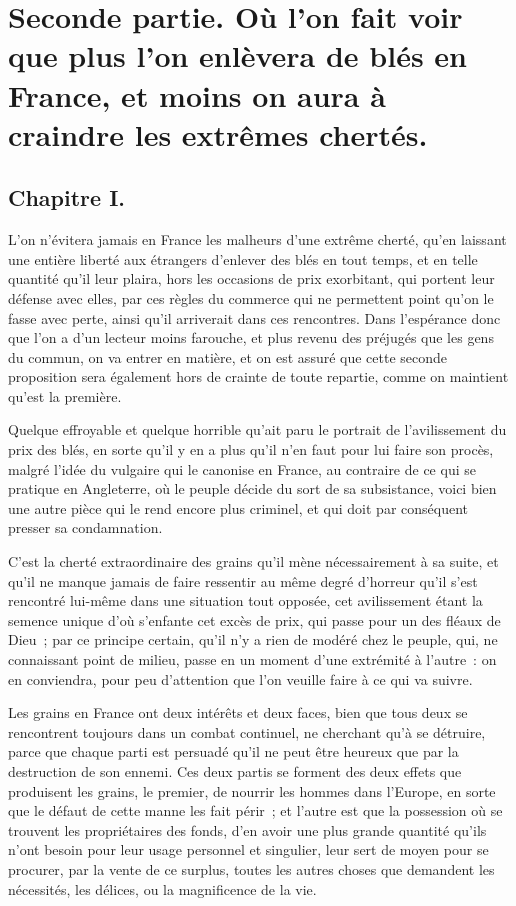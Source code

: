 \documentclass[french,twoside]{book} %
\begin{document}
\section[{Seconde partie. Où l’on fait voir que plus l’on enlèvera de blés en France, et moins on aura à craindre les extrêmes chertés.}]{Seconde partie. Où l’on fait voir que plus l’on enlèvera de blés en France, et moins on aura à craindre les extrêmes chertés.}
\subsection[{Chapitre I.}]{Chapitre I.}
\noindent L’on n’évitera jamais en France les malheurs d’une extrême cherté, qu’en laissant une entière liberté aux étrangers d’enlever des blés en tout temps, et en telle quantité qu’il leur plaira, hors les occasions de prix exorbitant, qui portent leur défense avec elles, par ces règles du commerce qui ne permettent point qu’on le fasse avec perte, ainsi qu’il arriverait dans ces rencontres. Dans l’espérance donc que l’on a d’un lecteur moins farouche, et plus revenu des préjugés que les gens du commun, on va entrer en matière, et on est assuré que cette seconde proposition sera également hors de crainte de toute repartie, comme on maintient qu’est la première.\par
Quelque effroyable et quelque horrible qu’ait paru le portrait de l’avilissement du prix des blés, en sorte qu’il y en a plus qu’il n’en faut pour lui faire son procès, malgré l’idée du vulgaire qui le canonise en France, au contraire de ce qui se pratique en Angleterre, où le peuple décide du sort de sa subsistance, voici bien une autre pièce qui le rend encore plus criminel, et qui doit par conséquent presser sa condamnation.\par
C’est la cherté extraordinaire des grains qu’il mène nécessairement à sa suite, et qu’il ne manque jamais de faire ressentir au même degré d’horreur qu’il s’est rencontré lui-même dans une situation tout opposée, cet avilissement étant la semence unique d’où s’enfante cet excès de prix, qui passe pour un des fléaux de Dieu ; par ce principe certain, qu’il n’y a rien de modéré chez le peuple, qui, ne connaissant point de milieu, passe en un moment d’une extrémité à l’autre : on en conviendra, pour peu d’attention que l’on veuille faire à ce qui va suivre.\par
Les grains en France ont deux intérêts et deux faces, bien que tous deux se rencontrent toujours dans un combat continuel, ne cherchant qu’à se détruire, parce que chaque parti est persuadé qu’il ne peut être heureux que par la destruction de son ennemi. Ces deux partis se forment des deux effets que produisent les grains, le premier, de nourrir les hommes dans l’Europe, en sorte que le défaut de cette manne les fait périr ; et l’autre est que la possession où se trouvent les propriétaires des fonds, d’en avoir une plus grande quantité qu’ils n’ont besoin pour leur usage personnel et singulier, leur sert de moyen pour se procurer, par la vente de ce surplus, toutes les autres choses que demandent les nécessités, les délices, ou la magnificence de la vie.\par
\end{document}
